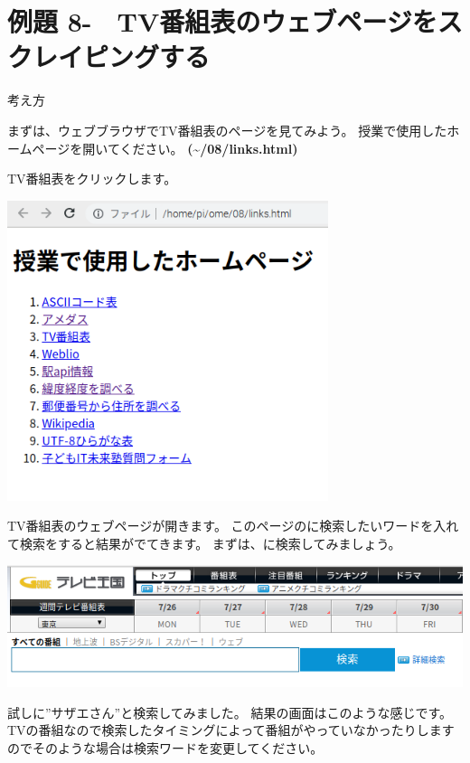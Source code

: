 \documentclass[a4paper,12pt,dvipdfmx]{jarticle}
\newcounter{Exercise}
\renewcommand\theExercise{例題 8-\arabic{Exercise}}
\begin{document}
\bigskip


\bigskip

\clearpage\section*{\theExercise　TV番組表のウェブページをスクレイピングする}
\addtocounter{Exercise}{-1}\label{E:TV}
考え方

まずは、ウェブブラウザでTV番組表のページを見てみよう。
授業で使用したホームページを開いてください。
\textbf{({\textasciitilde}/08/links.html)}

TV番組表をクリックします。



\begin{center}
\includegraphics[width=9.398cm]{textbook-img017.png}

\end{center}


\bigskip


\bigskip

TV番組表のウェブページが開きます。
このページのに検索したいワードを入れて検索をすると結果がでてきます。
まずは、に検索してみましょう。



\begin{center}
\includegraphics[width=14.099cm]{textbook-img041.png}

\end{center}
\clearpage
試しに”サザエさん”と検索してみました。
結果の画面はこのような感じです。
TVの番組なので検索したタイミングによって番組がやっていなかったりしますのでそのような場合は検索ワードを変更してください。
\end{document}
